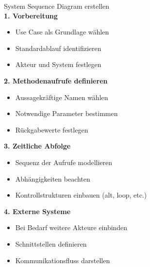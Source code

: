 \begin{KR}{System Sequence Diagram erstellen}\\
\textbf{1. Vorbereitung}
\begin{itemize}
    \item Use Case als Grundlage wählen
    \item Standardablauf identifizieren
    \item Akteur und System festlegen
\end{itemize}

\textbf{2. Methodenaufrufe definieren}
\begin{itemize}
    \item Aussagekräftige Namen wählen
    \item Notwendige Parameter bestimmen
    \item Rückgabewerte festlegen
\end{itemize}

\textbf{3. Zeitliche Abfolge}
\begin{itemize}
    \item Sequenz der Aufrufe modellieren
    \item Abhängigkeiten beachten
    \item Kontrollstrukturen einbauen (alt, loop, etc.)
\end{itemize}

\textbf{4. Externe Systeme}
\begin{itemize}
    \item Bei Bedarf weitere Akteure einbinden
    \item Schnittstellen definieren
    \item Kommunikationsfluss darstellen
\end{itemize}
\end{KR}

